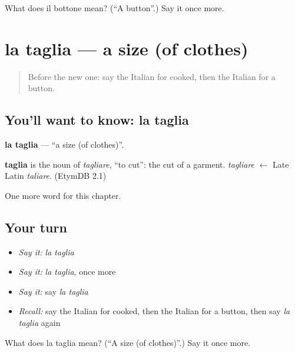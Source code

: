 \begin{tcolorbox}[breakable,colback=teal!4,colframe=teal!35!black,title={Before you move on}]
What does il bottone mean? (\textquotedblleft{}A button\textquotedblright{}.) Say it once more.
\end{tcolorbox}
\section[la taglia]{la taglia — a size (of clothes)}

\label{lesson:IT-C247-taglia}



\begin{quote}
Before the new one: say the Italian for cooked, then the Italian for a button.
\end{quote}

\subsection*{You'll want to know: la taglia}
\textbf{la taglia} — \textquotedblleft{}a size (of clothes)\textquotedblright{}.

\begin{cousinweb}
\textbf{taglia} is the noun of \emph{tagliare}, \textquotedblleft{}to cut\textquotedblright{}: the cut of a garment. \emph{tagliare} $\leftarrow$ Late Latin \emph{taliare}. (EtymDB 2.1)
\end{cousinweb}

\begin{grammarlens}[title={What you've built}]
One more word for this chapter.
\end{grammarlens}

\subsection*{Your turn}
\begin{itemize}
\raggedright
  \item \emph{Say it:} \emph{la taglia}
  \item \emph{Say it:} \emph{la taglia}, once more
  \item \emph{Say it:} say \emph{la taglia}
  \item \emph{Recall:} say the Italian for cooked, then the Italian for a button, then say \emph{la taglia} again
\end{itemize}

\begin{tcolorbox}[breakable,colback=teal!4,colframe=teal!35!black,title={Before you move on}]
What does la taglia mean? (\textquotedblleft{}A size (of clothes)\textquotedblright{}.) Say it once more.
\end{tcolorbox}
